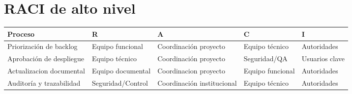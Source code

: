 \section{RACI de alto nivel}
\begin{longtable}{p{} p{} p{} p{} p{}}
\toprule
\textbf{Proceso} & \textbf{R} & \textbf{A} & \textbf{C} & \textbf{I} \\
\midrule
Priorización de backlog & Equipo funcional & Coordinación proyecto & Equipo técnico & Autoridades \\
Aprobación de despliegue & Equipo técnico & Coordinación proyecto & Seguridad/QA & Usuarios clave \\
Actualizacion documental & Equipo documental & Coordinacion proyecto & Equipo funcional & Autoridades \\
Auditoría y trazabilidad & Seguridad/Control & Coordinación institucional & Equipo técnico & Autoridades \\
\bottomrule
\end{longtable}
